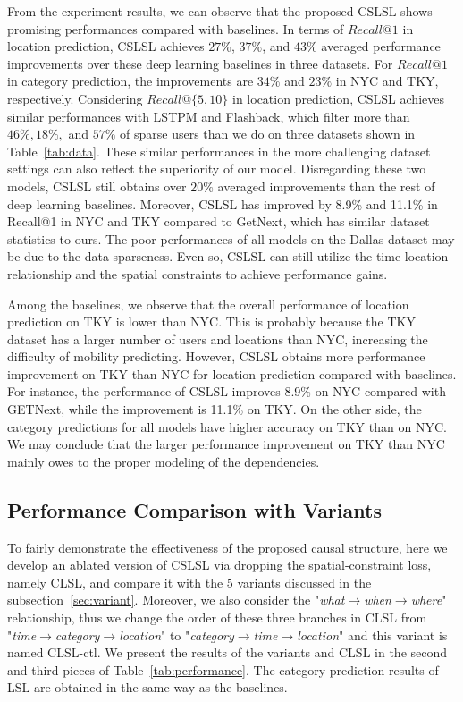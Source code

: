 \documentclass[sigconf]{acmart}
\begin{document}
    From the experiment results, we can observe that the proposed CSLSL shows promising performances compared with baselines. In terms of $Recall@1$ in location prediction, CSLSL achieves $27\%$, $37\%$, and $43\%$ averaged performance improvements over these deep learning  baselines in three datasets. For $Recall@1$ in category prediction, the improvements are $34\%$ and $23\%$ in NYC and TKY, respectively. Considering $Recall@\{5,10\}$ in location prediction, CSLSL achieves similar performances with LSTPM and Flashback, which filter more than $46\%, 18\%,$ and $57\%$ of sparse users than we do on three datasets shown in Table~\ref{tab:data}. 
    These similar performances in the more challenging dataset settings can also reflect the superiority of our model.
    Disregarding these two models, CSLSL still obtains over $20\%$ averaged improvements than the rest of deep learning baselines. 
    Moreover, CSLSL has improved by 8.9\% and 11.1\% in Recall@1 in NYC and TKY compared to GetNext, which has similar dataset statistics to ours.
    The poor performances of all models on the Dallas dataset may be due to the data sparseness. Even so, CSLSL can still utilize the time-location relationship and the spatial constraints to achieve performance gains.
    
    Among the baselines, we observe that the overall performance of location prediction on TKY is lower than NYC. This is probably because the TKY dataset has a larger number of users and locations than NYC, increasing the difficulty of mobility predicting. However, CSLSL obtains more performance improvement on TKY than NYC for location prediction compared with baselines. For instance, the performance of CSLSL improves 8.9\% on NYC compared with GETNext, while the improvement is 11.1\% on TKY. On the other side, the category predictions for all models have higher accuracy on TKY than on NYC. We may conclude that the larger performance improvement on TKY than NYC mainly owes to the proper modeling of the dependencies.


\subsection{Performance Comparison with Variants}
\label{sec:res_variants}

    To fairly demonstrate the effectiveness of the proposed causal structure, here we develop an ablated version of CSLSL via dropping the spatial-constraint loss, namely CLSL, and compare it with the 5 variants discussed in the subsection~\ref{sec:variant}. 
    Moreover, we also consider the "\textit{what$\to$when$\to$where}" relationship, thus we change the order of these three branches in CLSL from "\textit{time$\to$category$\to$location}" to "\textit{category$\to$time$\to$location}" and this variant is named CLSL-ctl. 
    We present the results of the variants and CLSL in the second and third pieces of Table~\ref{tab:performance}. The category prediction results of LSL are obtained in the same way as the baselines. 
    
\end{document}

